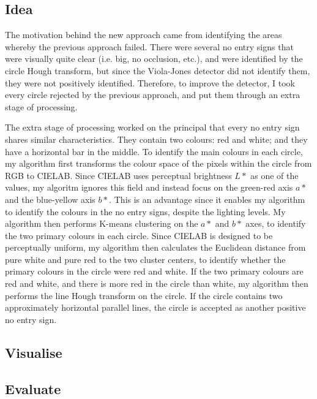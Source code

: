 \documentclass[twocolumn, 10pt, a4paper]{article}
\begin{document}
\subsection{Idea}

The motivation behind the new approach came from identifying the areas whereby the previous approach failed.
There were several no entry signs that were visually quite clear (i.e. big, no occlusion, etc.), and were identified by the circle Hough transform, but since the Viola-Jones detector did not identify them, they were not positively identified.
Therefore, to improve the detector, I took every circle rejected by the previous approach, and put them through an extra stage of processing.

The extra stage of processing worked on the principal that every no entry sign shares similar characteristics.
They contain two colours: red and white; and they have a horizontal bar in the middle.
To identify the main colours in each circle, my algorithm first transforms the colour space of the pixels within the circle from RGB to CIELAB.
Since CIELAB uses perceptual brightness $L*$ as one of the values, my algoritm ignores this field and instead focus on the green-red axis $a*$ and the blue-yellow axis $b*$.
This is an advantage since it enables my algorithm to identify the colours in the no entry signs, despite the lighting levels.
My algorithm then performs K-means clustering on the $a*$ and $b*$ axes, to identify the two primary colours in each circle.
Since CIELAB is designed to be perceptually uniform, my algorithm then calculates the Euclidean distance from pure white and pure red to the two cluster centers, to identify whether the primary colours in the circle were red and white.
If the two primary colours are red and white, and there is more red in the circle than white, my algorithm then performs the line Hough transform on the circle.
If the circle contains two approximately horizontal parallel lines, the circle is accepted as another positive no entry sign.

\subsection{Visualise}

\subsection{Evaluate}
\end{document}
